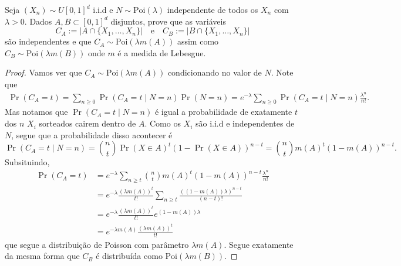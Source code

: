 \begin{exercise} [7]
	Seja $(X_n) \sim U[0,1]^d$ i.i.d e $N \sim \text{Poi}(\lambda)$
	independente de todos os $X_n$ com $\lambda > 0$. Dados $A,B \subset
	[0,1]^d$ disjuntos,
	prove que as variáveis
	\[
		C_A := |A \cap \{X_1, \dots, X_n\}| \quad \text{e} \quad C_B := |B
		\cap \{X_1, \dots, X_n\}|
	\]
	são independentes e que $C_A \sim \text{Poi}(\lambda m(A))$ assim
	como $C_B \sim \text{Poi}(\lambda m(B))$ onde $m$ é a medida de Lebesgue.
\end{exercise}

\begin{proof}
	Vamos ver que $C_A \sim \text{Poi}(\lambda m(A))$ condicionando no valor de $N$. Note que 
	\begin{align*}
		\Pr(C_A = t) = \sum_{n \geq 0} \Pr(C_A = t \mid N = n) \Pr(N = n) = e^{-\lambda}\sum_{n \geq 0} \Pr(C_A = t \mid N = n)\frac{\lambda^n}{n!}.
	\end{align*}
	Mas notamos que $\Pr(C_A = t \mid N = n)$ é igual a probabilidade de exatamente $t$ dos $n$ $X_i$ sorteados cairem dentro de $A$. Como os $X_i$ são i.i.d e independentes de 
	$N$, segue que a probabilidade disso acontecer é 
	\[
		\Pr(C_A = t \mid N = n) = \binom{n}{t}\Pr(X \in A)^t(1 - \Pr(X \in A))^{n-t} = \binom{n}{t}m(A)^t(1-m(A))^{n-t}.
	\]
	Subsituindo,
	\begin{align*}
		\Pr(C_A = t) &= e^{-\lambda}\sum_{n \geq t} \binom{n}{t}m(A)^t(1-m(A))^{n-t}\frac{\lambda^n}{n!}\\
		&= e^{-\lambda}\frac{(\lambda m(A))^t}{t!}\sum_{n \geq t} \frac{((1-m(A))\lambda)^{n-t}}{(n-t)!}\\
		&= e^{-\lambda}\frac{(\lambda m(A))^t}{t!} e^{(1-m(A))\lambda}\\
		&= e^{-\lambda m(A)} \frac{(\lambda m(A))^t}{t!}
	\end{align*}
	que segue a distribuição de Poisson com parâmetro $\lambda m(A)$. Segue exatamente da mesma forma que $C_B$ é distribuída como $\text{Poi}(\lambda m(B))$.


\end{proof}
